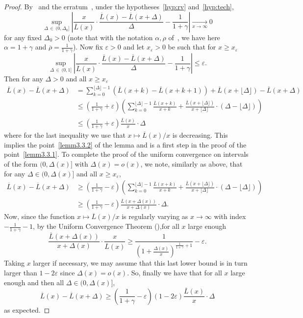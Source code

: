 \documentclass[10pt]{amsart}
\theoremstyle{definition}
\numberwithin{equation}{section}
\renewcommand{\bar}[1]{\overline{#1}}
\newcommand*{\MK}{\mkern 2mu}
\begin{document}
\begin{proof}
By~\cite[Theorem~1$\MK$(iii)]{DR13} and the erratum~\cite{DR16_err}, under the hypotheses~\eqref{hyp:rv} and~\eqref{hyp:tech},
\[
\sup_{\Delta\,\in\,(0,\Delta_0]} \left|\frac{x}{\bar L(x)} \cdot \frac{\bar L(x)-\bar L(x+\Delta)}{\Delta} - \frac{1}{1+\gamma}\right| \underset{x \rightarrow \infty}\rightarrow 0
\]
for any fixed $\Delta_0>0$ (note that with the notation $\alpha,\rho$ of~\cite{DR13}, we have here $\alpha=1+\gamma$ and $\bar \rho=\frac{1}{1+\gamma}$). Now fix $\varepsilon>0$ and let $x_{\varepsilon}>0$ be such that for $x \geq x_{\varepsilon}$
\[
\sup_{\Delta\,\in\,(0,1]} \left|\frac{x}{\bar L(x)} \cdot \frac{\bar L(x)-\bar L(x+\Delta)}{\Delta} - \frac{1}{1+\gamma}\right| \leq \varepsilon.
\]
Then for any $\Delta>0$ and all $x \geq x_{\varepsilon}$
\begin{align*}
\bar L(x)-\bar L(x+\Delta) &= \sum_{k=0}^{\lfloor\Delta \rfloor-1} \left(\bar L(x+k)-\bar L(x+k+1)\right)+\bar L(x+\lfloor\Delta \rfloor)-\bar L(x+\Delta) \\
& \leq \left(\frac{1}{1+\gamma} + \varepsilon\right) \left(\sum_{k=0}^{\lfloor\Delta \rfloor-1} \frac{\bar L(x+k)}{x+k} + \frac{\bar L(x+\lfloor\Delta \rfloor)}{x+\lfloor\Delta \rfloor} \cdot (\Delta-\lfloor\Delta \rfloor)\right) \\
& \leq \left(\frac{1}{1+\gamma} + \varepsilon\right) \frac{\bar L(x)}{x} \cdot \Delta
\end{align*}
where for the last inequality we use that $x \mapsto \bar L(x)/x$ is decreasing. This implies the point~\eqref{lemm3.3.2} of the lemma and is a first step in the proof of the point~\eqref{lemm3.3.1}. To complete the proof of the uniform convergence on intervals of the form $(0,\Delta(x)]$ with $\Delta(x)=o(x)$, we note, similarly as above, that for any $\Delta \in (0,\Delta(x)]$ and all $x \geq x_{\varepsilon}$,
\begin{align*}
\bar L(x)-\bar L(x+\Delta) &\geq \left(\frac{1}{1+\gamma} - \varepsilon\right) \left(\sum_{k=0}^{\lfloor\Delta \rfloor-1} \frac{\bar L(x+k)}{x+k} + \frac{\bar L(x+\lfloor\Delta \rfloor)}{x+\lfloor\Delta \rfloor} \cdot (\Delta-\lfloor\Delta \rfloor)\right) \\
&\geq
\left(\frac{1}{1+\gamma} - \varepsilon\right) \frac{\bar L(x+\Delta(x))}{x+\Delta(x)} \cdot \Delta.
\end{align*}
Now, since the function $x \mapsto \bar L(x)/x$ is regularly varying as $x \rightarrow \infty$ with index $-\frac{1}{1+\gamma}-1$, by the Uniform Convergence Theorem (\cite[Theorem~1.5.2]{BGT}),\linebreak for all $x$ large enough
\[
\frac{\bar L(x+\Delta(x))}{x+\Delta(x)} \cdot \frac{x}{\bar L(x)} \geq \frac{1}{\left(1+\frac{\Delta(x)}{x}\right)^{\frac{1}{1+\gamma}+1}}-\varepsilon.
\]
Taking $x$ larger if necessary, we may assume that this last lower bound is in turn larger than $1-2 \varepsilon$ since $\Delta(x)=o(x)$. So, finally we have that for all $x$ large enough and then all $\Delta \in (0,\Delta(x)]$,
\[
\bar L(x)-\bar L(x+\Delta) \geq \left(\frac{1}{1+\gamma} - \varepsilon\right) (1-2\varepsilon) \frac{\bar L(x)}{x} \cdot \Delta
\]
as expected.
\end{proof}
\end{document}
